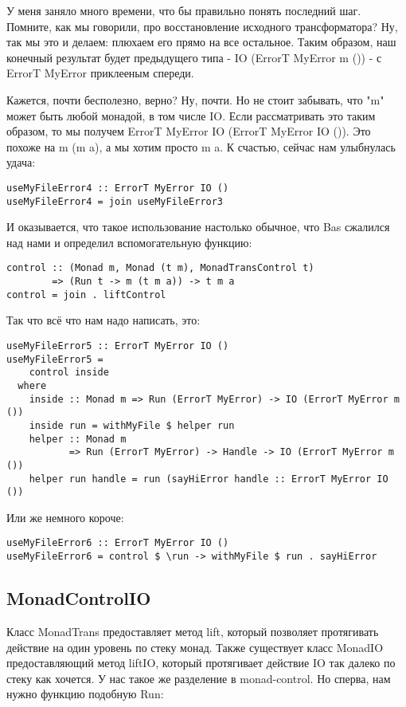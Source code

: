 У меня заняло много времени, что бы правильно понять последний шаг. Помните,
как мы говорили, про восстановление исходного трансформатора? Ну, так мы это и
делаем: плюхаем его прямо на все остальное. Таким образом, наш конечный
результат будет предыдущего типа - IO (ErrorT MyError m ()) - с ErrorT MyError
приклееным спереди.

Кажется, почти бесполезно, верно? Ну, почти. Но не стоит забывать, что "m"
может быть любой монадой, в том числе IO. Если рассматривать это таким образом,
то мы получем ErrorT MyError IO (ErrorT MyError IO ()). Это похоже на m (m a),
а мы хотим просто m a. К счастью, сейчас нам улыбнулась удача:

\begin{lstlisting}
useMyFileError4 :: ErrorT MyError IO ()
useMyFileError4 = join useMyFileError3
\end{lstlisting}

И оказывается, что такое использование настолько обычное, что Bas сжалился над
нами и определил вспомогательную функцию:

\begin{lstlisting}
control :: (Monad m, Monad (t m), MonadTransControl t)
        => (Run t -> m (t m a)) -> t m a
control = join . liftControl
\end{lstlisting}

Так что всё что нам надо написать, это:

\begin{lstlisting}
useMyFileError5 :: ErrorT MyError IO ()
useMyFileError5 =
    control inside
  where
    inside :: Monad m => Run (ErrorT MyError) -> IO (ErrorT MyError m ())
    inside run = withMyFile $ helper run
    helper :: Monad m
           => Run (ErrorT MyError) -> Handle -> IO (ErrorT MyError m ())
    helper run handle = run (sayHiError handle :: ErrorT MyError IO ())
\end{lstlisting}

Или же немного короче:

\begin{lstlisting}
useMyFileError6 :: ErrorT MyError IO ()
useMyFileError6 = control $ \run -> withMyFile $ run . sayHiError
\end{lstlisting}

\subsection{MonadControlIO}
Класс MonadTrans предоставляет метод lift, который позволяет протягивать
действие на один уровень по стеку монад. Также существует класс MonadIO
предоставляющий метод liftIO, который протягивает действие IO так далеко по
стеку как хочется. У нас такое же разделение в monad-control. Но сперва, нам
нужно функцию подобную Run:

